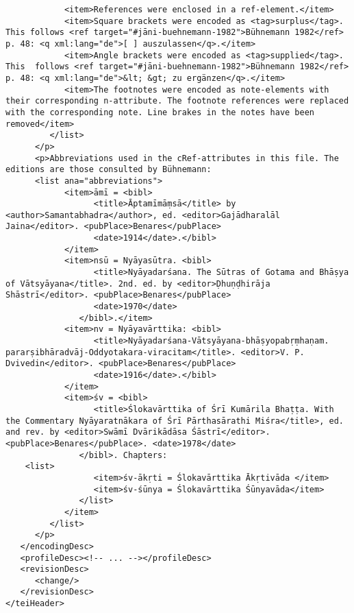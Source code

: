 \documentclass[article,12pt,a4paper]{memoir}%
\begin{document}
\begin{verbatim}
            <item>References were enclosed in a ref-element.</item>
            <item>Square brackets were encoded as <tag>surplus</tag>. This follows <ref target="#jāni-buehnemann-1982">Bühnemann 1982</ref> p. 48: <q xml:lang="de">[ ] auszulassen</q>.</item>
            <item>Angle brackets were encoded as <tag>supplied</tag>. This 	follows <ref target="#jāni-buehnemann-1982">Bühnemann 1982</ref> p. 48: <q xml:lang="de">&lt; &gt; zu ergänzen</q>.</item>
            <item>The footnotes were encoded as note-elements with their corresponding n-attribute. The footnote references were replaced with the corresponding note. Line brakes in the notes have been removed</item>
         </list>
      </p>
      <p>Abbreviations used in the cRef-attributes in this file. The editions are those consulted by Bühnemann:
      <list ana="abbreviations">
            <item>āmī = <bibl>
                  <title>Āptamīmāṃsā</title> by <author>Samantabhadra</author>, ed. <editor>Gajādharalāl Jaina</editor>. <pubPlace>Benares</pubPlace> 
                  <date>1914</date>.</bibl>
            </item>
            <item>nsū = Nyāyasūtra. <bibl>
                  <title>Nyāyadarśana. The Sūtras of Gotama and Bhāṣya of Vātsyāyana</title>. 2nd. ed. by <editor>Ḍhuṇḍhirāja Shāstrī</editor>. <pubPlace>Benares</pubPlace> 
                  <date>1970</date>
               </bibl>.</item>
            <item>nv = Nyāyavārttika: <bibl>
                  <title>Nyāyadarśana-Vātsyāyana-bhāṣyopabṛṃhaṇam. pararṣibhāradvāj-Oddyotakara-viracitam</title>. <editor>V. P. Dvivedin</editor>. <pubPlace>Benares</pubPlace> 
                  <date>1916</date>.</bibl>
            </item>
            <item>śv = <bibl>
                  <title>Ślokavārttika of Śrī Kumārila Bhaṭṭa. With the Commentary Nyāyaratnākara of Śrī Pārthasārathi Miśra</title>, ed. and rev. by <editor>Swāmī Dvārikādāsa Śāstrī</editor>. <pubPlace>Benares</pubPlace>. <date>1978</date>
               </bibl>. Chapters:
	<list>
                  <item>śv-ākṛti = Ślokavārttika Ākṛtivāda </item>
                  <item>śv-śūnya = Ślokavārttika Śūnyavāda</item>
               </list>
            </item>
         </list>
      </p>
   </encodingDesc>
   <profileDesc><!-- ... --></profileDesc>
   <revisionDesc>
      <change/>
   </revisionDesc>
</teiHeader>
	 \end{verbatim}
       
      \clearpage
      \begin{english}
      \printshorthands
      \printbibliography
      \end{english}
    
\end{document}
